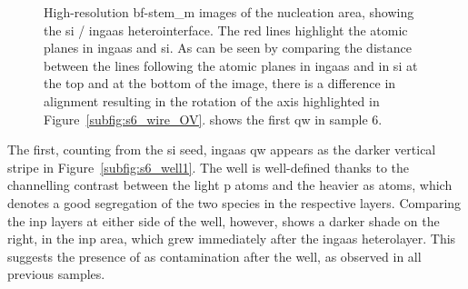 \begin{figure}
{
    }
    \caption[High-resolution \acs{bf}-\acs{stem_m} images of sample 6.]{High-resolution \acs{bf}-\acs{stem_m} images of  the nucleation area, showing the \acs{si} / \acs{ingaas} heterointerface. The red lines highlight the  atomic planes in \acs{ingaas} and \acs{si}. As can be seen by comparing the distance between the lines following the atomic planes in \acs{ingaas} and in \acs{si} at the top and at the bottom of the image, there is a difference in alignment resulting in the rotation of the  axis highlighted in Figure~\ref{subfig:s6_wire_OV}.  shows the first \acl{qw} in sample 6.}
    \label{fig:s6_HR}
\end{figure}

The first, counting from the \acl{si} seed, \acs{ingaas} \acl{qw} appears as the darker vertical stripe in Figure~\ref{subfig:s6_well1}. The well is well-defined thanks to the channelling contrast between the light \acl{p} atoms and the heavier \acs{as} atoms, which denotes a good segregation of the two species in the respective layers. Comparing the \acs{inp} layers at either side of the well, however, shows a darker shade on the right, in the \acs{inp} area, which grew immediately after the \acs{ingaas} heterolayer. This suggests the presence of \acl{as} contamination after the well, as observed in all previous samples.
\par

